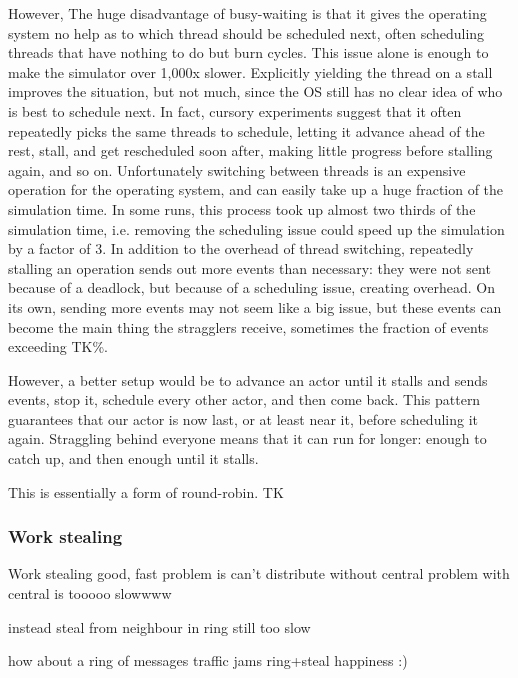 However, The huge disadvantage of busy-waiting is that it gives the operating system no help as to which thread should be scheduled next, often scheduling threads that have nothing to do but burn cycles.
This issue alone is enough to make the simulator over 1,000x slower. %
Explicitly yielding the thread on a stall improves the situation, but not much, since the OS still has no clear idea of who is best to schedule next. %
In fact, cursory experiments suggest that it often repeatedly picks the same threads to schedule, letting it advance ahead of the rest, stall, and get rescheduled soon after, making little progress before stalling again, and so on.
Unfortunately switching between threads is an expensive operation for the operating system, and can easily take up a huge fraction of the simulation time.
In some runs, this process took up almost two thirds of the simulation time, i.e. removing the scheduling issue could speed up the simulation by a factor of 3. %
In addition to the overhead of thread switching, repeatedly stalling an operation sends out more  events than necessary: they were not sent because of a deadlock, but because of a scheduling issue, creating overhead.
On its own, sending more events may not seem like a big issue, but these  events can become the main thing the stragglers receive, sometimes the fraction of  events exceeding TK\%. %

However, a better setup would be to advance an actor until it stalls and sends  events, stop it, schedule every other actor, and then come back.
This pattern guarantees that our actor is now last, or at least near it, before scheduling it again.
Straggling behind everyone means that it can run for longer: enough to catch up, and then enough until it stalls.

This is essentially a form of round-robin.
TK

\subsubsection{Work stealing}

Work stealing good, fast
problem is can't distribute without central
problem with central is tooooo slowwww

instead steal from neighbour in ring
still too slow

how about a ring of messages
traffic jams
ring+steal
happiness :)